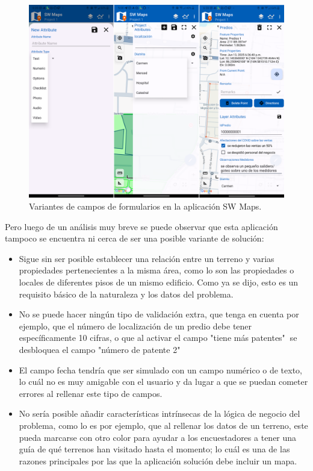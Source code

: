 \begin{figure}[h]
    \centering
    \includegraphics[scale=0.15]{Graphics/sw_maps_campos.png}
    \caption{Variantes de campos de formularios en la aplicación SW Maps.}
    \label{fig:figura9}
\end{figure}

Pero luego de un análisis muy breve se puede observar que esta aplicación tampoco se encuentra ni cerca de ser una posible variante de solución:
\begin{itemize}
    \item Sigue sin ser posible establecer una relación entre un terreno y varias propiedades pertenecientes a la misma área, como lo son las propiedades o locales de diferentes pisos de un mismo edificio. Como ya se dijo, esto es un requisito básico de la naturaleza y los datos del problema.
    \item No se puede hacer ningún tipo de validación extra, que tenga en cuenta por ejemplo, que el número de localización de un predio debe tener específicamente 10 cifras, o que al activar el campo "tiene más patentes" $~$se desbloquea el campo "número de patente 2"
    \item El campo fecha tendría que ser simulado con un campo numérico o de texto, lo cuál no es muy amigable con el usuario y da lugar a que se puedan cometer errores al rellenar este tipo de campos.
    \item No sería posible añadir características intrínsecas de la lógica de negocio del problema, como lo es por ejemplo, que al rellenar los datos de un terreno, este pueda marcarse con otro color para ayudar a los encuestadores a tener una guía de qué terrenos han visitado hasta el momento; lo cuál es una de las razones principales por las que la aplicación solución debe incluir un mapa.
\end{itemize}








